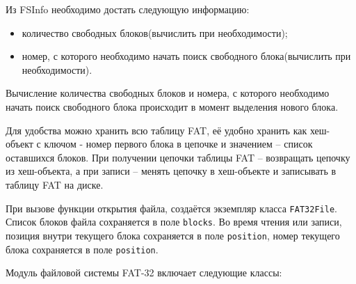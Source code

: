 Из FSInfo необходимо достать следующую информацию:

\begin{itemize}
\item количество свободных блоков(вычислить при необходимости);
\item номер, с которого необходимо начать поиск свободного блока(вычислить при необходимости).
\end{itemize}

Вычисление количества свободных блоков и номера, с которого необходимо начать поиск свободного блока происходит в момент выделения нового блока.

Для удобства можно хранить всю таблицу FAT, её удобно хранить как хеш-объект с ключом - номер первого блока в цепочке и значением -- список оставшихся блоков. При получении цепочки таблицы FAT -- возвращать цепочку из хеш-объекта, а при записи -- менять цепочку в хеш-объекте и записывать в таблицу FAT на диске.

При вызове функции открытия файла, создаётся экземпляр класса \texttt{FAT32File}. Список блоков файла сохраняется в поле \texttt{blocks}. Во время чтения или записи, позиция внутри текущего блока сохраняется в поле \texttt{position}, номер текущего блока сохраняется в поле \texttt{position}.

Модуль файловой системы FAT-32 включает следующие классы:

